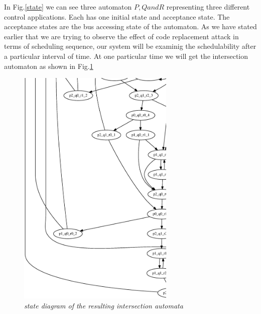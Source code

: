 In Fig.\ref{state} we can see three automaton $P,Q and R$ representing three different control applications.
Each has one initial state and acceptance state. The acceptance states are the bus accessing state
of the automaton.
As we have stated earlier that we are trying to observe the effect 
of code replacement attack in terms of scheduling sequence, our system will be examinig the
schedulability after a particular interval of time. At one particular time we will get the 
intersection automaton as shown in Fig.\ref{state-transition}
\begin{figure}
\begin{center}
\includegraphics[width= 75mm]{graph.eps}
\end{center}
\caption{{\em state diagram of the resulting intersection automata}}
\label{state-transition}
\end{figure}



